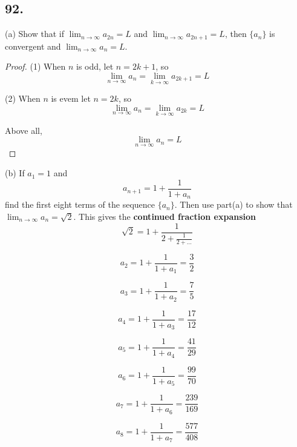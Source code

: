\documentclass{article}
\begin{document}
    \subsection*{92.}
    
    (a) Show that if $\lim_{n \to \infty} a_{2n} = L$ and $\lim_{n \to \infty}a_{2n+1} = L$, then $\{a_n\}$ is convergent and $\lim_{n \to \infty} a_n = L$.

    \begin{proof}
        (1) When $n$ is odd, let $n = 2k + 1$, so $$\lim_{n \to \infty}a_n = \lim_{k \to \infty}a_{2k + 1} = L$$

        (2) When $n$ is evem let $n = 2k$, so $$\lim_{n \to \infty}a_n = \lim_{k \to \infty}a_{2k} = L$$

        Above all, $$\lim_{n \to \infty}a_n = L$$

    \end{proof}
    (b) If $a_1 = 1$ and $$a_{n+1} = 1 + \frac{1}{1 + a_n}$$ find the first eight terms of the sequence $\{a_n\}$. Then use part(a) to show that $\lim_{n \to \infty}a_n = \sqrt{2}$. This gives the \textbf{continued fraction expansion}$$\sqrt{2} = 1 + \frac{1}{2+\frac{1}{2 + \dots}}$$

    $$a_2 = 1 + \frac{1}{1 + a_1} = \frac{3}{2}$$

    $$a_3 = 1 + \frac{1}{1 + a_2} = \frac{7}{5}$$

    $$a_4 = 1 + \frac{1}{1 + a_3} = \frac{17}{12}$$

    $$a_5 = 1 + \frac{1}{1 + a_4} = \frac{41}{29}$$

    $$a_6 = 1 + \frac{1}{1 + a_5} = \frac{99}{70}$$

    $$a_7 = 1 + \frac{1}{1 + a_6} = \frac{239}{169}$$

    $$a_8 = 1 + \frac{1}{1 + a_7} = \frac{577}{408}$$
\end{document}
